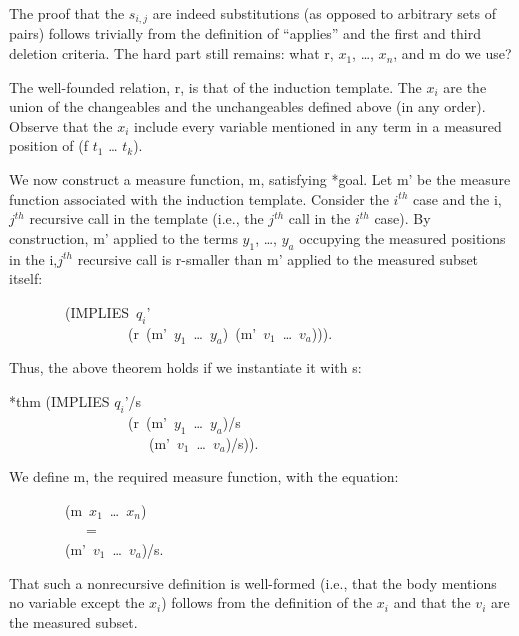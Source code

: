 \documentclass[10pt]{book}
\newenvironment{pubasis}{\begin{flushleft}}{\end{flushleft}}
\begin{document}
The proof that the $s_{i,j}$ are indeed substitutions (as opposed
to arbitrary sets of pairs) follows trivially from the definition of ``applies''
and the first and third deletion criteria.  The hard part still remains:
what r, $x_{1}$, \ldots{}, $x_{n}$, and m do we use?

The well-founded relation, r, is that of the induction template.
The $x_{i}$ are the union of the changeables and the unchangeables
defined above (in any order).  Observe that the $x_{i}$ include every
variable mentioned in any term in a measured position of (f $t_{1}$ \ldots{} $t_{k}$).

We now construct a measure function, m, satisfying *goal.  Let m'
be the measure function associated with the induction template.  Consider
the $i^{th}$ case and the i,$j^{th}$ recursive call in the template (i.e.,
the $j^{th}$ call in the $i^{th}$ case).
By construction, m' applied to the terms $y_{1}$, \ldots{}, $y_{a}$ occupying
the measured positions in the i,$j^{th}$ recursive call is r-smaller
than m' applied to the measured subset itself:
\begin{pubasis}
~~~~~~~~(IMPLIES~$q_{i}$'\\
~~~~~~~~~~~~~~~~~(r~(m'~$y_{1}$~\ldots{}~$y_{a}$)~(m'~$v_{1}$~\ldots{}~$v_{a}$))).\\
\end{pubasis}
Thus, the above theorem holds if we instantiate it with s:
\begin{pubasis}
*thm	(IMPLIES $q_{i}$'/s\\
~~~~~~~~~~~~~~~~~(r~(m'~$y_{1}$~\ldots{}~$y_{a}$)/s\\
~~~~~~~~~~~~~~~~~~~~(m'~$v_{1}$~\ldots{}~$v_{a}$)/s)).\\
\end{pubasis}
We define m, the required measure function, with the equation:
\begin{pubasis}
~~~~~~~~(m~$x_{1}$~\ldots{}~$x_{n}$)\\
~~~~~~~~~~~=\\
~~~~~~~~(m'~$v_{1}$~\ldots{}~$v_{a}$)/s.\\
\end{pubasis}
That such a nonrecursive definition is well-formed (i.e., that the body
mentions no variable except the $x_{i}$) follows from the definition
of the $x_{i}$ and that the $v_{i}$ are the measured subset.
\end{document}
